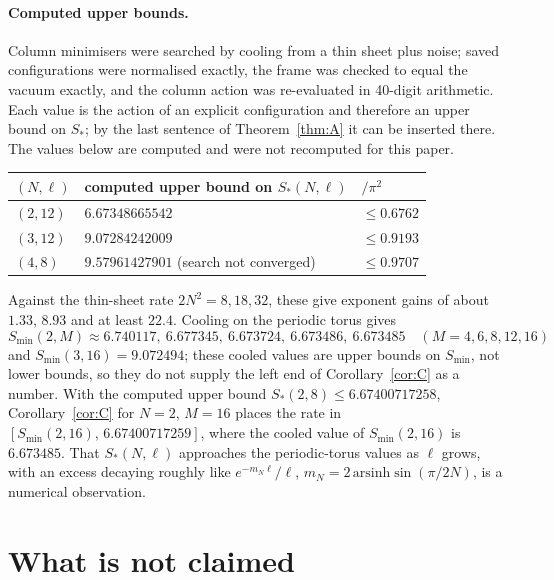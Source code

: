 \documentclass[11pt,a4paper]{article}
\theoremstyle{definition}
\theoremstyle{remark}
\begin{document}
\paragraph{Computed upper bounds.}
Column minimisers were searched by cooling from a thin sheet plus noise; saved configurations were normalised exactly, the frame was checked to equal the vacuum exactly, and the column action was re-evaluated in 40-digit arithmetic. Each value is the action of an explicit configuration and therefore an upper bound on $S_*$; by the last sentence of Theorem~\ref{thm:A} it can be inserted there. The values below are computed and were not recomputed for this paper.
\begin{center}
\begin{tabular}{lll}\toprule
$(N,\ell)$ & computed upper bound on $S_*(N,\ell)$ & $/\pi^2$ \\\midrule
$(2,12)$ & $6.67348665542$ & $\le0.6762$\\
$(3,12)$ & $9.07284242009$ & $\le0.9193$\\
$(4,8)$ & $9.57961427901$ (search not converged) & $\le0.9707$\\\bottomrule
\end{tabular}
\end{center}
Against the thin-sheet rate $2N^2=8,18,32$, these give exponent gains of about $1.33$, $8.93$ and at least $22.4$.
Cooling on the periodic torus gives
\[ S_{\min}(2,M)\approx6.740117,\ 6.677345,\ 6.673724,\ 6.673486,\ 6.673485\quad(M=4,6,8,12,16) \]
and $S_{\min}(3,16)=9.072494$; these cooled values are upper bounds on $S_{\min}$, not lower bounds, so they do not supply the left end of Corollary~\ref{cor:C} as a number. With the computed upper bound $S_*(2,8)\le6.67400717258$, Corollary~\ref{cor:C} for $N=2$, $M=16$ places the rate in $[S_{\min}(2,16),\,6.67400717259]$, where the cooled value of $S_{\min}(2,16)$ is $6.673485$.
That $S_*(N,\ell)$ approaches the periodic-torus values as $\ell$ grows, with an excess decaying roughly like $e^{-m_N\ell}/\ell$, $m_N=2\,\mathrm{arsinh}\sin(\pi/2N)$, is a numerical observation.

\section{What is not claimed}\label{sec:notclaimed}
\end{document}
